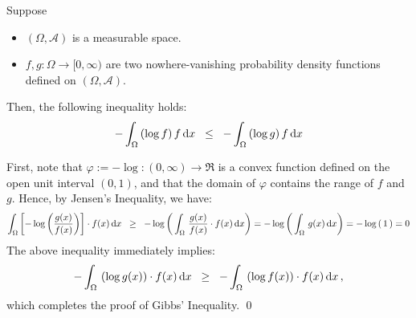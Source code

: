 \begin{theorem}
\mbox{} \vskip 0.1cm
\noindent
Suppose
\begin{itemize}
\item  $(\Omega,\mathcal{A})$ is a measurable space.
\item  $f, g : \Omega \longrightarrow [0,\infty)$ are two nowhere-vanishing probability density functions defined on $(\Omega,\mathcal{A})$.
\end{itemize}
Then, the following inequality holds:
\begin{equation*}
- \int_{\Omega} \left(\log f\right) f \, \textnormal{d}x
\;\; \leq \;\;
- \int_{\Omega} \left(\log g\right) f \, \textnormal{d}x
\end{equation*}
\end{theorem}
\proof
First, note that $\varphi := - \log : (0,\infty) \longrightarrow \Re$ is a convex function defined
on the open unit interval $(0,1)$, and that the domain of $\varphi$ contains the range of $f$ and
$g$.  Hence, by Jensen's Inequality, we have:
\begin{equation*}
\int_{\Omega} \left[-\log\left(\dfrac{g(x)}{f(x)}\right)\right] \cdot f(x) \, \textnormal{d}x
\;\; \geq \;\;
- \log\left(\,\int_{\Omega}\, \dfrac{g(x)}{f(x)} \cdot f(x) \, \textnormal{d}x \right)
=
- \log\left(\,\int_{\Omega}\, g(x) \, \textnormal{d}x \right)
=
- \log\left(\,1\,\right)
 = 0
\end{equation*}
The above inequality immediately implies:
\begin{equation*}
- \int_{\Omega}\,\left(\log g(x)\right)\cdot f(x) \,\textnormal{d}x
\;\; \geq \;\;
- \int_{\Omega}\,\left(\log f(x)\right)\cdot f(x) \,\textnormal{d}x\,,
\end{equation*}
which completes the proof of Gibbs' Inequality.  \qed


